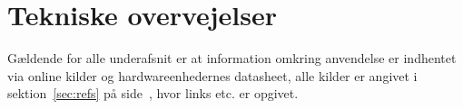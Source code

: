 \section{Tekniske overvejelser}

Gældende for alle underafsnit er at information omkring anvendelse er indhentet via online kilder og hardwareenhedernes datasheet, alle kilder er angivet i sektion~\ref{sec:refs} på side~\pageref{sec:refs}, hvor links etc. er opgivet.







